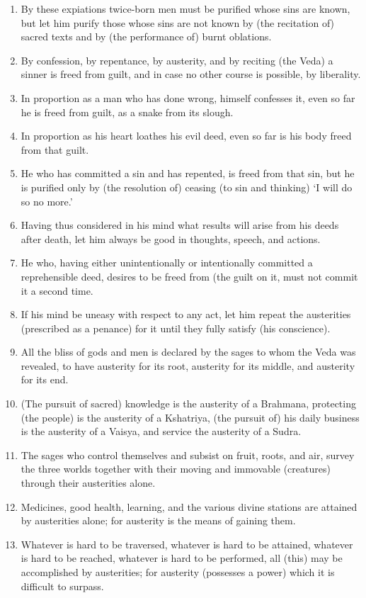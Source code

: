 \begin{enumerate}
\item By these expiations twice-born men must be purified whose sins are known, but let him purify those whose sins are not known by (the recitation of) sacred texts and by (the performance of) burnt oblations.
\item By confession, by repentance, by austerity, and by reciting (the Veda) a sinner is freed from guilt, and in case no other course is possible, by liberality.
\item In proportion as a man who has done wrong, himself confesses it, even so far he is freed from guilt, as a snake from its slough.
\item In proportion as his heart loathes his evil deed, even so far is his body freed from that guilt.
\item He who has committed a sin and has repented, is freed from that sin, but he is purified only by (the resolution of) ceasing (to sin and thinking) `I will do so no more.'
\item Having thus considered in his mind what results will arise from his deeds after death, let him always be good in thoughts, speech, and actions.
\item He who, having either unintentionally or intentionally committed a reprehensible deed, desires to be freed from (the guilt on it, must not commit it a second time.
\item If his mind be uneasy with respect to any act, let him repeat the austerities (prescribed as a penance) for it until they fully satisfy (his conscience).
\item All the bliss of gods and men is declared by the sages to whom the Veda was revealed, to have austerity for its root, austerity for its middle, and austerity for its end.
\item (The pursuit of sacred) knowledge is the austerity of a Brahmana, protecting (the people) is the austerity of a Kshatriya, (the pursuit of) his daily business is the austerity of a Vaisya, and service the austerity of a Sudra.
\item The sages who control themselves and subsist on fruit, roots, and air, survey the three worlds together with their moving and immovable (creatures) through their austerities alone.
\item Medicines, good health, learning, and the various divine stations are attained by austerities alone; for austerity is the means of gaining them.
\item Whatever is hard to be traversed, whatever is hard to be attained, whatever is hard to be reached, whatever is hard to be performed, all (this) may be accomplished by austerities; for austerity (possesses a power) which it is difficult to surpass.

\end{enumerate}
